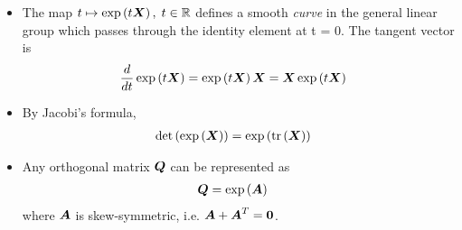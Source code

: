 \documentclass[11pt]{article}
\begin{document}
\begin{itemize}
\begin{itemize}
\item The map
$t \mapsto \exp\left(t\boldsymbol{X}\right), \; t \in {\mathbb R}$
defines a smooth \emph{curve} in the general linear group which passes through the identity element at t = 0. The tangent vector is 
\begin{align*}
\frac{d}{dt}\exp\left(t\boldsymbol{X}\right) &= \exp\left(t\boldsymbol{X}\right)\boldsymbol{X} = \boldsymbol{X}\exp\left(t\boldsymbol{X}\right)
\end{align*}

\item By Jacobi's formula,
\begin{align*}
\det\left(\exp\left(\boldsymbol{X}\right)\right) &= \exp\left(\mathrm{tr}\left(\boldsymbol{X} \right)\right)
\end{align*}

\item Any orthogonal matrix $\boldsymbol{Q}$ can be represented as 
\begin{align}
\boldsymbol{Q} &= \exp\left(\boldsymbol{A}\right)
\end{align}
where $\boldsymbol{A}$ is skew-symmetric, i.e. $\boldsymbol{A} + \boldsymbol{A}^{T} = \boldsymbol{0}$.
\end{itemize}


\end{itemize}
\end{document}
